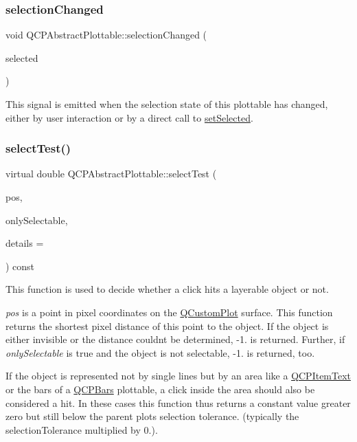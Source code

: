 \subsubsection{\texorpdfstring{selection\+Changed}{selectionChanged}}
{\footnotesize\ttfamily void Q\+C\+P\+Abstract\+Plottable\+::selection\+Changed (\begin{DoxyParamCaption}\item[{bool}]{selected }\end{DoxyParamCaption})\hspace{0.3cm}{\ttfamily [signal]}}

This signal is emitted when the selection state of this plottable has changed, either by user interaction or by a direct call to \hyperlink{class_q_c_p_abstract_plottable_afbd5428c2952f59d952e11ab5cd79176}{set\+Selected}. \hypertarget{class_q_c_p_abstract_plottable_a38efe9641d972992a3d44204bc80ec1d}{}\label{class_q_c_p_abstract_plottable_a38efe9641d972992a3d44204bc80ec1d} 
\subsubsection{\texorpdfstring{select\+Test()}{selectTest()}}
{\footnotesize\ttfamily virtual double Q\+C\+P\+Abstract\+Plottable\+::select\+Test (\begin{DoxyParamCaption}\item[{const Q\+PointF \&}]{pos,  }\item[{bool}]{only\+Selectable,  }\item[{Q\+Variant $\ast$}]{details = {} }\end{DoxyParamCaption}) const\hspace{0.3cm}{\ttfamily [pure virtual]}}

This function is used to decide whether a click hits a layerable object or not.

{\itshape pos} is a point in pixel coordinates on the \hyperlink{class_q_custom_plot}{Q\+Custom\+Plot} surface. This function returns the shortest pixel distance of this point to the object. If the object is either invisible or the distance couldn\textquotesingle{}t be determined, -\/1. is returned. Further, if {\itshape only\+Selectable} is true and the object is not selectable, -\/1. is returned, too.

If the object is represented not by single lines but by an area like a \hyperlink{class_q_c_p_item_text}{Q\+C\+P\+Item\+Text} or the bars of a \hyperlink{class_q_c_p_bars}{Q\+C\+P\+Bars} plottable, a click inside the area should also be considered a hit. In these cases this function thus returns a constant value greater zero but still below the parent plot\textquotesingle{}s selection tolerance. (typically the selection\+Tolerance multiplied by 0.).

